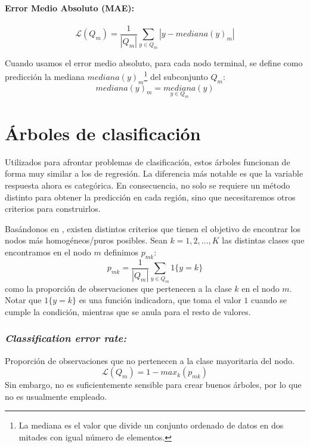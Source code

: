 \documentclass[titlepage, 11pt]{book}
\begin{document}
\paragraph*{Error Medio Absoluto (MAE):}
\begin{equation*}
    \mathcal{L}(Q_m)=\frac{1}{|Q_m|} \sum_{y \in Q_m} |y- mediana(y)_m|
\end{equation*}

Cuando usamos el error medio absoluto, para cada nodo terminal, se define como predicción la mediana $mediana(y)_m$\footnote{La mediana es el valor que divide un conjunto ordenado de datos en dos mitades con igual número de elementos.} del subconjunto $Q_m$:
\begin{equation*}
    mediana(y)_m=\underset{y \in Q_m}{mediana}(y)
\end{equation*}



\section{Árboles de clasificación}
Utilizados para afrontar problemas de clasificación, estos árboles funcionan de forma muy similar a los de regresión. La diferencia más notable es que la variable respuesta ahora es categórica. En consecuencia, no solo se requiere un método distinto para obtener la predicción en cada región, sino que necesitaremos otros criterios para construirlos.

Basándonos en \cite{scikit-learn}, existen distintos criterios que tienen el objetivo de encontrar los nodos más homogéneos/puros posibles. Sean $k=1,2,...,K$ las distintas clases que encontramos en el nodo $m$ definimos $p_{mk}$:
\begin{equation*}
    p_{mk}=\frac{1}{|Q_m|} \sum_{y \in Q_m}1\{y=k\} 
\end{equation*}
como la proporción de observaciones que pertenecen a la clase $k$ en el nodo $m$. Notar que $1\{y=k\}$ es una función indicadora, que toma el valor $1$ cuando se cumple la condición, mientras que se anula para el resto de valores.

\subsubsection*{\textit{Classification error rate:}}
Proporción de observaciones que no pertenecen a la clase mayoritaria del nodo.
\begin{equation*}
    \mathcal{L}(Q_m)=1-max_k(p_{mk})
\end{equation*}
Sin embargo, no es suficientemente sensible para crear buenos árboles, por lo que no es usualmente empleado.
\end{document}
